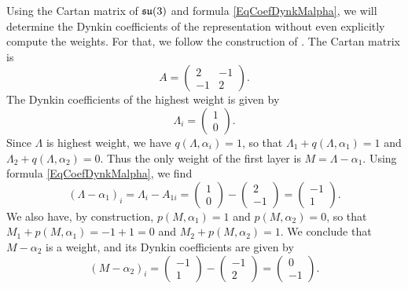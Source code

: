 Using the Cartan matrix of $\operatorname{\mathfrak{su}}(3)$ and formula \eqref{EqCoefDynkMalpha}, we will determine the Dynkin coefficients of the representation 
%
 without even explicitly compute the weights. For that, we follow the construction of \cite{rncahn}. The Cartan matrix is
\begin{equation}
	A=
	\begin{pmatrix}
		2	&	-1	\\ 
		-1	&	2	
	\end{pmatrix}.
\end{equation}
The Dynkin coefficients of the highest weight is given by
\begin{equation}
	\Lambda_i=
	\begin{pmatrix}
		1	\\ 
		0	
	\end{pmatrix}.
\end{equation}
Since $\Lambda$ is highest weight, we have $q(\Lambda,\alpha_i)=1$, so that $\Lambda_1+q(\Lambda,\alpha_1)=1$ and $\Lambda_2+q(\Lambda,\alpha_2)=0$. Thus the only weight of the first layer is $M=\Lambda-\alpha_1$.
Using formula \eqref{EqCoefDynkMalpha}, we find
\begin{equation}
	(\Lambda-\alpha_1)_i=\Lambda_i-A_{1i}=
	\begin{pmatrix}
		1	\\ 
		0	
	\end{pmatrix}-
	\begin{pmatrix}
		2	\\ 
		-1	
	\end{pmatrix}=
	\begin{pmatrix}
		-1	\\ 
		1	
	\end{pmatrix}.
\end{equation}
We also have, by construction, $p(M,\alpha_1)=1$ and $p(M,\alpha_2)=0$, so that $M_1+p(M,\alpha_1)=-1+1=0$ and $M_2+p(M,\alpha_2)=1$. We conclude that $M-\alpha_2$ is a weight, and its Dynkin coefficients are given by
\begin{equation}
	(M-\alpha_2)_i=
	\begin{pmatrix}
		-1	\\ 
		1	
	\end{pmatrix}-
	\begin{pmatrix}
		-1	\\ 
		2	
	\end{pmatrix}=
	\begin{pmatrix}
		0	\\ 
		-1	
	\end{pmatrix}.
\end{equation}

